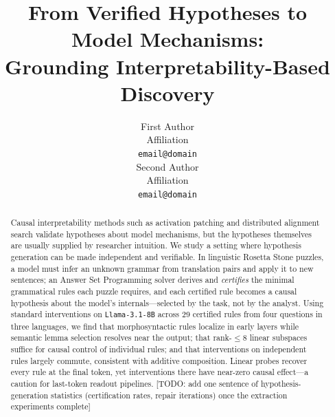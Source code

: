 \documentclass[11pt]{article}
\title{From Verified Hypotheses to Model Mechanisms:\\
Grounding Interpretability-Based Discovery}
\author{First Author \\
  Affiliation \\
  \texttt{email@domain} \\\And
  Second Author \\
  Affiliation \\
  \texttt{email@domain} \\}
\newif\ifdraft\drafttrue
\newcommand{\TODO}[1]{\ifdraft\textcolor{red!70!black}{[TODO: #1]}\fi}
\begin{document}
\maketitle

\begin{abstract}
Causal interpretability methods such as activation patching and distributed
alignment search validate hypotheses about model mechanisms, but the
hypotheses themselves are usually supplied by researcher intuition. We study
a setting where hypothesis generation can be made independent and
verifiable. In linguistic Rosetta Stone puzzles, a model must infer an
unknown grammar from translation pairs and apply it to new sentences; an
Answer Set Programming solver derives and \emph{certifies} the minimal
grammatical rules each puzzle requires, and each certified rule becomes a
causal hypothesis about the model's internals---selected by the task, not by
the analyst. Using standard interventions on \texttt{Llama-3.1-8B} across 29
certified rules from four questions in three languages, we find that
morphosyntactic rules localize in early layers while semantic lemma
selection resolves near the output; that rank-$\le$8 linear subspaces
suffice for causal control of individual rules; and that interventions on
independent rules largely commute, consistent with additive composition.
Linear probes recover every rule at the final token, yet interventions there
have near-zero causal effect---a caution for last-token readout pipelines.
\TODO{add one sentence of hypothesis-generation statistics (certification
rates, repair iterations) once the extraction experiments complete}
\end{abstract}












\appendix

\end{document}
